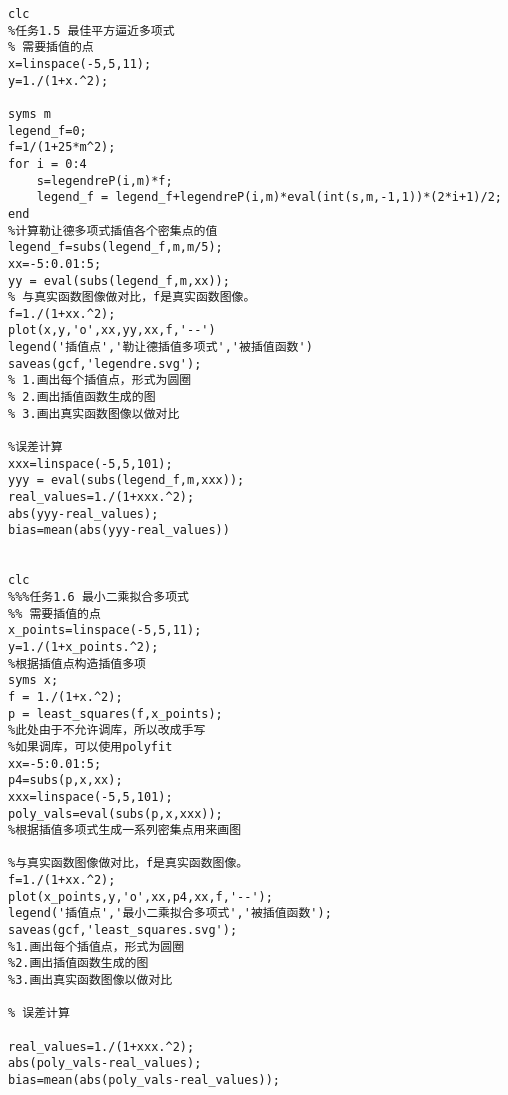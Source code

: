 \documentclass{ctexart}%
\begin{document}
\begin{lstlisting}
clc
%任务1.5 最佳平方逼近多项式
% 需要插值的点
x=linspace(-5,5,11);   
y=1./(1+x.^2);

syms m
legend_f=0;
f=1/(1+25*m^2);
for i = 0:4
    s=legendreP(i,m)*f;
    legend_f = legend_f+legendreP(i,m)*eval(int(s,m,-1,1))*(2*i+1)/2;
end
%计算勒让德多项式插值各个密集点的值
legend_f=subs(legend_f,m,m/5);
xx=-5:0.01:5;
yy = eval(subs(legend_f,m,xx));
% 与真实函数图像做对比，f是真实函数图像。
f=1./(1+xx.^2);
plot(x,y,'o',xx,yy,xx,f,'--')
legend('插值点','勒让德插值多项式','被插值函数')
saveas(gcf,'legendre.svg');
% 1.画出每个插值点，形式为圆圈
% 2.画出插值函数生成的图
% 3.画出真实函数图像以做对比

%误差计算
xxx=linspace(-5,5,101);
yyy = eval(subs(legend_f,m,xxx));
real_values=1./(1+xxx.^2);
abs(yyy-real_values);
bias=mean(abs(yyy-real_values))


clc 
%%%任务1.6 最小二乘拟合多项式
%% 需要插值的点
x_points=linspace(-5,5,11);   
y=1./(1+x_points.^2);
%根据插值点构造插值多项
syms x;
f = 1./(1+x.^2);
p = least_squares(f,x_points);
%此处由于不允许调库，所以改成手写
%如果调库，可以使用polyfit
xx=-5:0.01:5;
p4=subs(p,x,xx);
xxx=linspace(-5,5,101);
poly_vals=eval(subs(p,x,xxx));
%根据插值多项式生成一系列密集点用来画图

%与真实函数图像做对比，f是真实函数图像。
f=1./(1+xx.^2);
plot(x_points,y,'o',xx,p4,xx,f,'--');
legend('插值点','最小二乘拟合多项式','被插值函数');
saveas(gcf,'least_squares.svg');
%1.画出每个插值点，形式为圆圈
%2.画出插值函数生成的图
%3.画出真实函数图像以做对比

% 误差计算

real_values=1./(1+xxx.^2);
abs(poly_vals-real_values);
bias=mean(abs(poly_vals-real_values));


\end{lstlisting}
\end{document}
